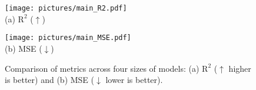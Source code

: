 \begin{figure*}[tb]
\vskip 0.15in
\begin{center}
\begin{minipage}[b]{0.49\textwidth} %
    \centering
    \texttt{[image: pictures/main\_R2.pdf]}\\
    (a) $\text{R}^2$ ($\uparrow$)
\end{minipage}
\hfill
\begin{minipage}[b]{0.49\textwidth} %
    \centering
    \texttt{[image: pictures/main\_MSE.pdf]}\\
    (b) MSE ($\downarrow$)
\end{minipage}
\end{center}
\centering
\caption{Comparison of metrics across four sizes of models: (a) $\text{R}^2$ ($\uparrow$ higher is better) and (b) MSE ($\downarrow$ lower is better).}
\label{main_figures}
\end{figure*}

